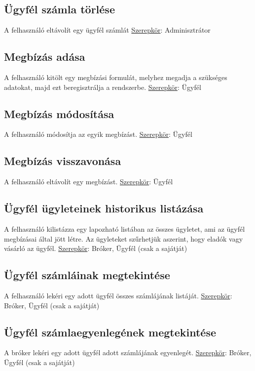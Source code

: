 \subsection{Ügyfél számla törlése}
A felhasználó eltávolít egy ügyfél számlát
\newline \underline{Szerepkör}: Adminisztrátor

\subsection{Megbízás adása}
 A felhasználó kitölt egy megbízási formulát, melyhez megadja a szükséges adatokat, majd ezt beregisztrálja a rendszerbe.
\newline \underline{Szerepkör}: Ügyfél

\subsection{Megbízás módosítása}
A felhasználó módosítja az egyik megbízást.
\newline \underline{Szerepkör}: Ügyfél

\subsection{Megbízás visszavonása}
A felhasználó eltávolít egy megbízást.
\newline \underline{Szerepkör}: Ügyfél

\subsection{Ügyfél ügyleteinek historikus listázása}
A felhasználó kilistázza egy lapozható listában az összes ügyletet, ami az ügyfél megbízásai által jött létre. Az ügyleteket szűrhetjük aszerint, hogy eladók vagy vásárló az ügyfél.
\newline \underline{Szerepkör}: Bróker, Ügyfél (csak a sajátját)

\subsection{Ügyfél számláinak megtekintése}
A felhasználó lekéri egy adott ügyfél összes számlájának listáját.
\newline \underline{Szerepkör}: Bróker, Ügyfél (csak a sajátját)

\subsection{Ügyfél számlaegyenlegének megtekintése}
A bróker lekéri egy adott ügyfél adott számlájának egyenlegét.
\newline \underline{Szerepkör}: Bróker, Ügyfél (csak a sajátját)

